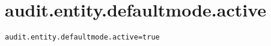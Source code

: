 \section{audit.entity.defaultmode.active}
\label{configuration:AuditEntityDefaultmodeActive}
\AvailableInJavaOnly{\TODO}
\begin{lstlisting}[style=Props,caption={Usage example for \textit{audit.entity.defaultmode.active}}]
audit.entity.defaultmode.active=true
\end{lstlisting}